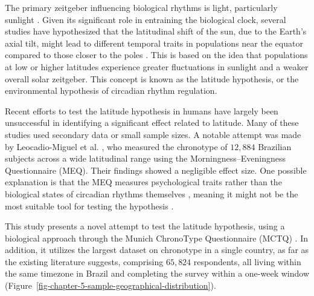 \documentclass[
12pt,
openright,
oneside,
a4paper,
chapter=TITLE,
section=TITLE,
french,
spanish,
brazil,
english
]{abntex2}
\begin{document}
The primary zeitgeber influencing biological rhythms is light,
particularly sunlight \autocite{aschoff1972}. Given its significant role
in entraining the biological clock, several studies have hypothesized
that the latitudinal shift of the sun, due to the Earth's axial tilt,
might lead to different temporal traits in populations near the equator
compared to those closer to the poles
\autocite{bohlen1973,pittendrigh1991,roenneberg2003,randler2008,hut2013,leocadio-miguel2017,randler2017}.
This is based on the idea that populations at low or higher latitudes
experience greater fluctuations in sunlight and a weaker overall solar
zeitgeber. This concept is known as the latitude hypothesis, or the
environmental hypothesis of circadian rhythm regulation.

Recent efforts to test the latitude hypothesis in humans have largely
been unsuccessful in identifying a significant effect related to
latitude. Many of these studies used secondary data or small sample
sizes. A notable attempt was made by Leocadio-Miguel et al.
\autocite*{leocadio-miguel2017}, who measured the chronotype of
\(12,884\) Brazilian subjects across a wide latitudinal range using the
Morningness--Eveningness Questionnaire (MEQ). Their findings showed a
negligible effect size. One possible explanation is that the MEQ
measures psychological traits rather than the biological states of
circadian rhythms themselves \autocite{roenneberg2019}, meaning it might
not be the most suitable tool for testing the hypothesis
\autocite{leocadio-miguel2014}.

This study presents a novel attempt to test the latitude hypothesis,
using a biological approach through the Munich ChronoType Questionnaire
(MCTQ) \autocite{roenneberg2003}. In addition, it utilizes the largest
dataset on chronotype in a single country, as far as the existing
literature suggests, comprising \(65,824\) respondents, all living
within the same timezone in Brazil and completing the survey within a
one-week window
(Figure~\ref{fig-chapter-5-sample-geographical-distribution}).
\end{document}
